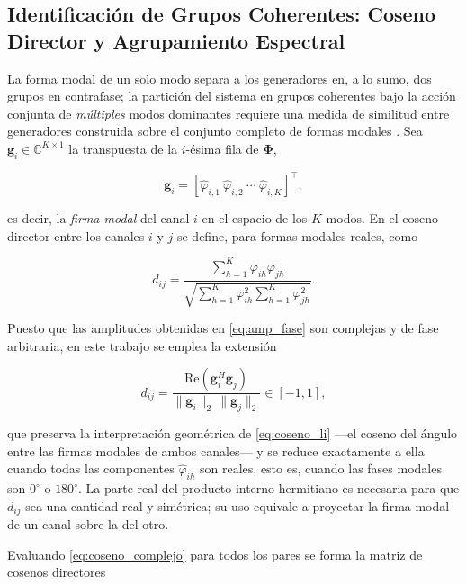 \subsection{Identificación de Grupos Coherentes: Coseno Director y
Agrupamiento Espectral}

La forma modal de un solo modo separa a los generadores en, a lo sumo,
dos grupos en contrafase; la partición del sistema en grupos coherentes
bajo la acción conjunta de \emph{múltiples} modos dominantes requiere una
medida de similitud entre generadores construida sobre el conjunto
completo de formas modales \cite{jiang2021,Li2018}. Sea $\mathbf{g}_i \in \mathbb{C}^{K \times 1}$ 
la transpuesta de la $i$-ésima fila de $\boldsymbol{\Phi}$,

\begin{equation}
\mathbf{g}_i = [\hat{\varphi}_{i,1}\ \hat{\varphi}_{i,2}\ \cdots\ \hat{\varphi}_{i,K}]^{\top},
\label{eq:vector_firma}
\end{equation}

es decir, la \textit{firma modal} del canal $i$ en el espacio de los $K$ modos. 
En \cite{li2020era} el coseno director entre los canales $i$ y $j$ se define, para 
formas modales reales, como

\begin{equation}
d_{ij} = \frac{\sum_{h=1}^{K} \varphi_{ih}\varphi_{jh}}{\sqrt{\sum_{h=1}^{K}\varphi_{ih}^2 \sum_{h=1}^{K}\varphi_{jh}^2}}.
\label{eq:coseno_li}
\end{equation}

Puesto que las amplitudes obtenidas en \eqref{eq:amp_fase} son complejas y de fase
 arbitraria, en este trabajo se emplea la extensión

\begin{equation}
d_{ij} = \frac{\text{Re}\left(\mathbf{g}_i^{H}\mathbf{g}_j\right)}{\|\mathbf{g}_i\|_2\,\|\mathbf{g}_j\|_2} \in [-1,1],
\label{eq:coseno_complejo}
\end{equation}

que preserva la interpretación geométrica de \eqref{eq:coseno_li} ---el coseno del ángulo 
entre las firmas modales de ambos canales--- y se reduce exactamente a ella cuando todas las 
componentes $\hat{\varphi}_{ih}$ son reales, esto es, cuando las fases modales son $0^{\circ}$ 
o $180^{\circ}$. La parte real del producto interno hermitiano es necesaria para que $d_{ij}$ 
sea una cantidad real y simétrica; su uso equivale a proyectar la firma modal de un canal 
sobre la del otro.

Evaluando \eqref{eq:coseno_complejo} para todos los pares se forma la matriz de cosenos directores

